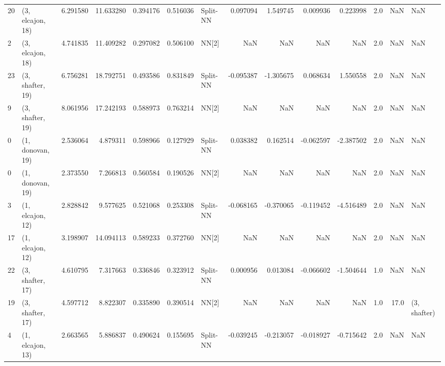\begin{tabular}{llrrrrlrrrrrrl}
20 &  (3, elcajon, 18) &  6.291580 &  11.633280 &   0.394176 &  0.516036 &    Split-NN &        0.097094 &      1.549745 &       0.009936 &     0.223998 &            2.0 &    NaN &              NaN \\
2  &  (3, elcajon, 18) &  4.741835 &  11.409282 &   0.297082 &  0.506100 &       NN[2] &             NaN &           NaN &            NaN &          NaN &            2.0 &    NaN &              NaN \\
23 &  (3, shafter, 19) &  6.756281 &  18.792751 &   0.493586 &  0.831849 &    Split-NN &       -0.095387 &     -1.305675 &       0.068634 &     1.550558 &            2.0 &    NaN &              NaN \\
9  &  (3, shafter, 19) &  8.061956 &  17.242193 &   0.588973 &  0.763214 &       NN[2] &             NaN &           NaN &            NaN &          NaN &            2.0 &    NaN &              NaN \\
0  &  (1, donovan, 19) &  2.536064 &   4.879311 &   0.598966 &  0.127929 &    Split-NN &        0.038382 &      0.162514 &      -0.062597 &    -2.387502 &            2.0 &    NaN &              NaN \\
0  &  (1, donovan, 19) &  2.373550 &   7.266813 &   0.560584 &  0.190526 &       NN[2] &             NaN &           NaN &            NaN &          NaN &            2.0 &    NaN &              NaN \\
3  &  (1, elcajon, 12) &  2.828842 &   9.577625 &   0.521068 &  0.253308 &    Split-NN &       -0.068165 &     -0.370065 &      -0.119452 &    -4.516489 &            2.0 &    NaN &              NaN \\
17 &  (1, elcajon, 12) &  3.198907 &  14.094113 &   0.589233 &  0.372760 &       NN[2] &             NaN &           NaN &            NaN &          NaN &            2.0 &    NaN &              NaN \\
22 &  (3, shafter, 17) &  4.610795 &   7.317663 &   0.336846 &  0.323912 &    Split-NN &        0.000956 &      0.013084 &      -0.066602 &    -1.504644 &            1.0 &    NaN &              NaN \\
19 &  (3, shafter, 17) &  4.597712 &   8.822307 &   0.335890 &  0.390514 &       NN[2] &             NaN &           NaN &            NaN &          NaN &            1.0 &   17.0 &     (3, shafter) \\
4  &  (1, elcajon, 13) &  2.663565 &   5.886837 &   0.490624 &  0.155695 &    Split-NN &       -0.039245 &     -0.213057 &      -0.018927 &    -0.715642 &            2.0 &    NaN &              NaN \\

\end{tabular}
